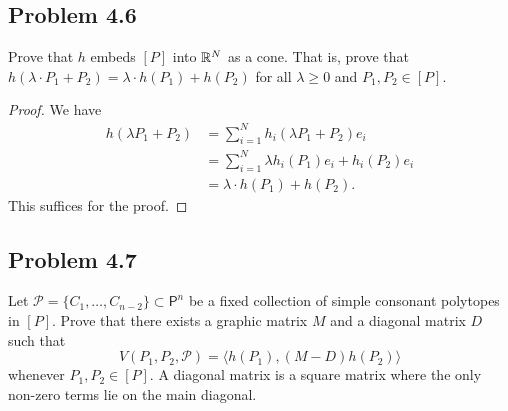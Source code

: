 \documentclass[12pt]{article}
\begin{document}
\subsection{Problem 4.6}

\begin{problem}
	Prove that $h$ embeds $[P]$ into $\mathbb{R}^N$ as a cone. That is, prove that $h(\lambda \cdot P_1 + P_2) = \lambda \cdot h(P_1) + h(P_2)$ for all $\lambda \geq 0$ and $P_1, P_2 \in [P]$. 
\end{problem} 

\begin{proof}
	We have
	\begin{align*}
		h(\lambda P_1 + P_2) & = \sum_{i = 1}^N h_i(\lambda P_1 + P_2) e_i \\
		& = \sum_{i = 1}^N \lambda h_i(P_1)e_i + h_i(P_2)e_i \\
		& = \lambda \cdot h(P_1) + h(P_2). 
	\end{align*}
	This suffices for the proof. 
\end{proof}

\newpage 

\subsection{Problem 4.7}

\begin{problem} \label{problem-4.7}
	Let $\mathcal{P} = \{C_1, \ldots, C_{n-2}\} \subset \mathsf{P}^n$ be a fixed collection of simple consonant polytopes in $[P]$. Prove that there exists a graphic matrix $M$ and a diagonal matrix $D$ such that 
    \[
        V(P_1, P_2, \mathcal{P}) = \langle h(P_1), (M-D) h(P_2) \rangle    
    \]
    whenever $P_1, P_2 \in [P]$. A diagonal matrix is a square matrix where the only non-zero terms lie on the main diagonal.
\end{problem}
\end{document}
